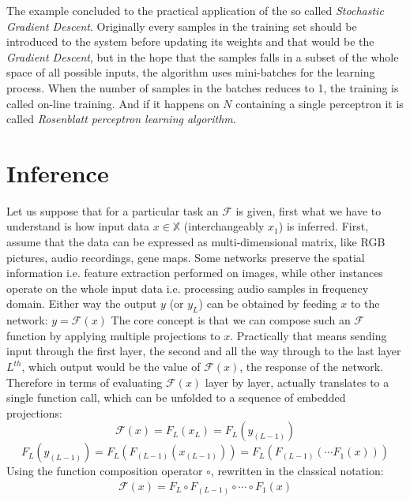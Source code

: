 The example concluded to the practical application of the so called \emph{Stochastic Gradient Descent}. Originally every samples in the training set should be introduced to the system before updating its weights and that would be the \emph{Gradient Descent}, but in  the hope that the samples falls in a subset of the whole space of all possible inputs, the algorithm uses mini-batches for the learning process. When the number of samples in the batches reduces to 1, the training is called on-line training. And if it happens on $N$ containing a single perceptron it is called \emph{Rosenblatt perceptron learning algorithm}.


\section{Inference}
Let us suppose that for a particular task an $\mathcal{F}$ is given, first what we have to understand is how input data 
$x \in \mathbb{X}$ (interchangeably $x_1$) is inferred.
First, assume that the data can be expressed as multi-dimensional matrix, like RGB pictures, audio recordings, gene maps.
Some networks preserve the spatial information i.e. feature extraction performed on images, 
while other instances operate on the whole input data i.e. processing audio samples in frequency domain.
Either way the output $y$ (or $y_L$) can be obtained by feeding $x$ to the network: 
$ y = \mathcal{F}(x)$
The core concept is that we can compose such an $\mathcal{F}$ function by applying multiple projections to $x$.
Practically that means sending input through the first layer, the second and all the way through to the last layer $L^{th}$, which output would be the value of $\mathcal{F}(x)$, the response of the network.
Therefore in terms of evaluating $\mathcal{F}(x)$ layer by layer, actually translates to a single function call, which can be unfolded to a sequence of embedded projections:
$$
    \mathcal{F}(x) = F_L \left( x_L \right) = F_L \left( y_{(L-1)} \right)
$$
$$
    F_L \left( y_{(L-1)} \right) = 
    F_L \left( F_{(L-1)} \left( x_{(L-1)} \right) \right) = F_L \left( F_{(L-1)}\left( \cdots F_1(x)\right)\right)
$$
Using the function composition operator $\circ$, rewritten in the classical notation:
\begin{equation}\label{eq:forward}
\begin{split}
    \mathcal{F}(x) = F_L \circ F_{(L-1)} \circ \cdots \circ F_1(x)
\end{split}
\end{equation}

